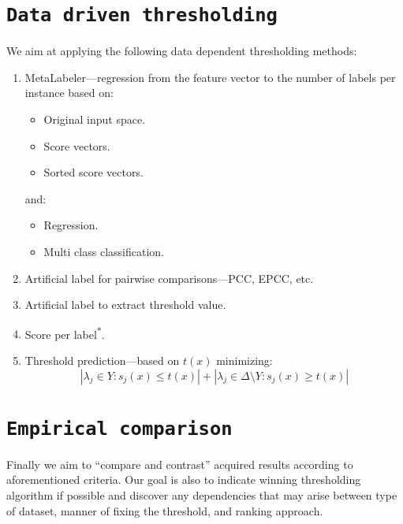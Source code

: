 \documentclass[12pt,a4paper,twocolumn]{article}
\newcommand{\ts}{\textsuperscript}
\begin{document}
\section*{\texttt{Data driven thresholding}}
We aim at applying the following data dependent thresholding methods:
\begin{enumerate}
\item MetaLabeler---regression from the feature vector to the number of labels per instance based on:
	\begin{itemize} %
	\item Original input space.
	\item Score vectors.
	\item Sorted score vectors.
	\end{itemize}
	and:
	\begin{itemize} %
	\item Regression.
	\item Multi class classification.
	\end{itemize}

\item Artificial label for pairwise comparisons---PCC, EPCC, etc.
\item Artificial label to extract threshold value.
\item Score per label\ts{*}.
\item Threshold prediction---based on $t(x)$ minimizing:
	$$
	| \lambda_j \in Y : s_j(x) \leq t(x) | + | \lambda_j \in \Delta \text{\textbackslash{}} Y : s_j(x) \geq t(x) |
	$$
\end{enumerate}

\section*{\texttt{Empirical comparison}}
Finally we aim to ``compare and contrast'' acquired results according to aforementioned criteria. Our goal is also to indicate winning thresholding algorithm if possible and discover any dependencies that may arise between type of dataset, manner of fixing the threshold, and ranking approach.

\end{document}
